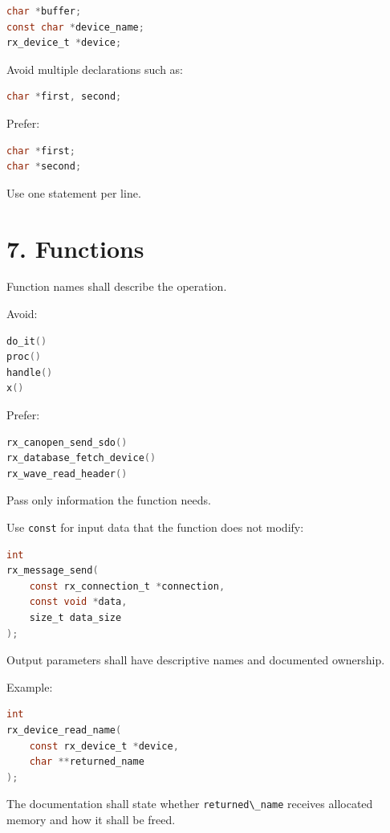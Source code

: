 \documentclass[11pt,a4paper]{article}
\begin{document}
\begin{lstlisting}[language=C]
char *buffer;
const char *device_name;
rx_device_t *device;
\end{lstlisting}

Avoid multiple declarations such as:

\begin{lstlisting}[language=C]
char *first, second;
\end{lstlisting}

Prefer:

\begin{lstlisting}[language=C]
char *first;
char *second;
\end{lstlisting}

Use one statement per line.

\section{7. Functions}\label{7-functions}

Function names shall describe the operation.

Avoid:

\begin{lstlisting}[language=C]
do_it()
proc()
handle()
x()
\end{lstlisting}

Prefer:

\begin{lstlisting}[language=C]
rx_canopen_send_sdo()
rx_database_fetch_device()
rx_wave_read_header()
\end{lstlisting}

Pass only information the function needs.

Use \passthrough{\lstinline!const!} for input data that the function
does not modify:

\begin{lstlisting}[language=C]
int
rx_message_send(
    const rx_connection_t *connection,
    const void *data,
    size_t data_size
);
\end{lstlisting}

Output parameters shall have descriptive names and documented ownership.

Example:

\begin{lstlisting}[language=C]
int
rx_device_read_name(
    const rx_device_t *device,
    char **returned_name
);
\end{lstlisting}

The documentation shall state whether
\passthrough{\lstinline!returned\_name!} receives allocated memory and
how it shall be freed.
\end{document}
